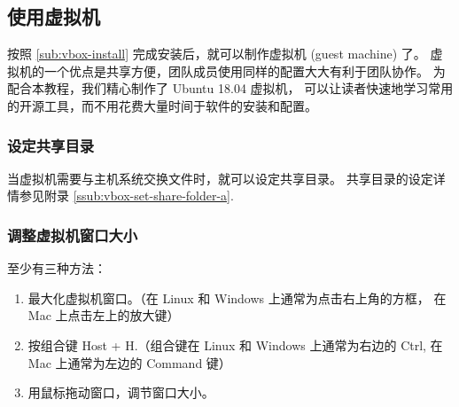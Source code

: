 \documentclass[
    11pt,
    cite=authoryear,
    device=normal,
    lang=cn,
    mode=simple,
    result=answer,
    toc=onecol,
]{elegantbook_sierxue}
\begin{document}

\subsection{使用虚拟机}%
\label{sub:vbox-vm}

按照 \ref{sub:vbox-install} 完成安装后，就可以制作虚拟机 (guest
machine) 了。
虚拟机的一个优点是共享方便，团队成员使用同样的配置大大有利于团队协作。
为配合本教程，我们精心制作了 Ubuntu 18.04 虚拟机，
可以让读者快速地学习常用的开源工具，而不用花费大量时间于软件的安装和配置。

\subsubsection{设定共享目录}%
\label{ssub:vbox-set-share-folder}

当虚拟机需要与主机系统交换文件时，就可以设定共享目录。
共享目录的设定详情参见附录 \ref{ssub:vbox-set-share-folder-a}.

\subsubsection{调整虚拟机窗口大小}%
\label{ssub:vbox-set-window-size}

至少有三种方法：
\begin{enumerate}
    \item 最大化虚拟机窗口。（在 Linux 和 Windows 上通常为点击右上角的方框，
        在 Mac 上点击左上的放大键）
    \item 按组合键 Host + H.（组合键在 Linux 和 Windows 上通常为右边的
        Ctrl, 在 Mac 上通常为左边的 Command 键）
    \item 用鼠标拖动窗口，调节窗口大小。
\end{enumerate}
\end{document}
